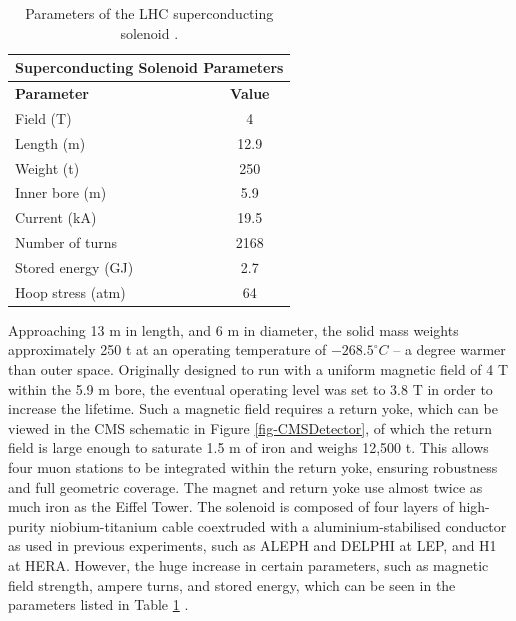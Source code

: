 \begin{table} 
\begin{center}
\begin{tabular}{|l|c|}
\hline
	\multicolumn{2}{|c|}{\textbf{Superconducting Solenoid Parameters}} \\
\hline
	\textbf{Parameter} & \textbf{Value} \\
\hline
	Field (T) & 4 \\
	Length (m) & 12.9 \\
	Weight (t) & 250 \\
	Inner bore (m) & 5.9 \\
	Current (kA) & 19.5 \\
	Number of turns & 2168 \\
	Stored energy (GJ) & 2.7 \\
	Hoop stress (atm) & 64 \\
\hline
\end{tabular}	
\end{center}
\caption{Parameters of the LHC superconducting solenoid \cite{MagneticField}.}
\label{tab-SolenoidParameters}
\end{table}

Approaching 13 m in length, and 6 m in diameter, the solid mass weights approximately 250 t at an operating temperature of $-268.5^\circ C$ -- a degree warmer than outer space. Originally designed to run with a uniform magnetic field of 4 T within the 5.9 m bore, the eventual operating level was set to 3.8 T in order to increase the lifetime. Such a magnetic field requires a return yoke, which can be viewed in the CMS schematic in Figure \ref{fig-CMSDetector}, of which the return field is large enough to saturate 1.5 m of iron and weighs 12,500 t. This allows four muon stations to be integrated within the return yoke, ensuring robustness and full geometric coverage. The magnet and return yoke use almost twice as much iron as the Eiffel Tower. The solenoid is composed of four layers of high-purity niobium-titanium cable coextruded with a aluminium-stabilised conductor as used in previous experiments, such as ALEPH and DELPHI at LEP, and H1 at HERA. However, the huge increase in certain parameters, such as magnetic field strength, ampere turns, and stored energy, which can be seen in the parameters listed in Table \ref{tab-SolenoidParameters} \cite{PTDR2}. 

